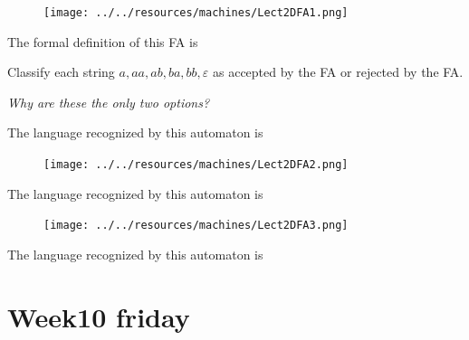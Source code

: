 \documentclass[12pt, oneside]{article}
\begin{document}
\begin{figure}[h]
   \centering
   \texttt{[image: ../../resources/machines/Lect2DFA1.png]} 
\end{figure}
   
The formal definition of this FA is
   
\vspace{100pt}
   

Classify each string $a, aa, ab, ba, bb, \varepsilon$ as accepted by the FA or rejected by the FA.  

{\it Why are these the only two options?}

\vspace{200pt}


The language recognized by this automaton is
  
\vspace{100pt}
   

\begin{figure}[h]
  \centering
  \texttt{[image: ../../resources/machines/Lect2DFA2.png]} 
\end{figure}
   

The language recognized by this automaton is
  
\vspace{100pt}

\begin{figure}[h]
    \centering
    \texttt{[image: ../../resources/machines/Lect2DFA3.png]} 
\end{figure}

The language recognized by this automaton is
  
\vspace{100pt}
 \vfill
\section*{Week10 friday}
\end{document}
